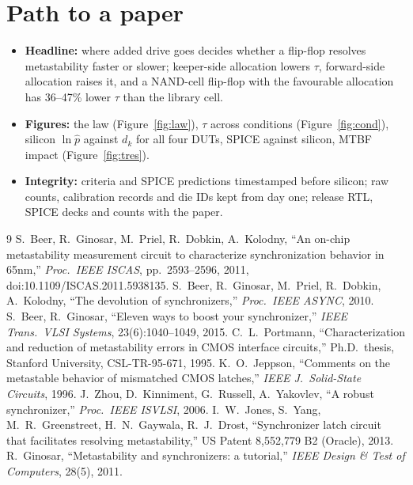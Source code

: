 \documentclass[11pt]{article}
\begin{document}
\section{Path to a paper}
\begin{itemize}
\item \textbf{Headline:} where added drive goes decides whether a flip-flop resolves metastability faster or slower;
  keeper-side allocation lowers $\tau$, forward-side allocation raises it, and a NAND-cell flip-flop with the
  favourable allocation has 36--47\% lower $\tau$ than the library cell.
\item \textbf{Figures:} the law (Figure~\ref{fig:law}), $\tau$ across conditions (Figure~\ref{fig:cond}), silicon
  $\ln\hat p$ against $d_k$ for all four DUTs, SPICE against silicon, MTBF impact (Figure~\ref{fig:tres}).
\item \textbf{Integrity:} criteria and SPICE predictions timestamped before silicon; raw counts, calibration records
  and die IDs kept from day one; release RTL, SPICE decks and counts with the paper.
\end{itemize}

\begin{thebibliography}{9}\small
{} S.~Beer, R.~Ginosar, M.~Priel, R.~Dobkin, A.~Kolodny, ``An on-chip metastability measurement
circuit to characterize synchronization behavior in 65nm,'' \emph{Proc.\ IEEE ISCAS}, pp.~2593--2596, 2011,
doi:10.1109/ISCAS.2011.5938135.
 S.~Beer, R.~Ginosar, M.~Priel, R.~Dobkin, A.~Kolodny, ``The devolution of synchronizers,''
\emph{Proc.\ IEEE ASYNC}, 2010.
 S.~Beer, R.~Ginosar, ``Eleven ways to boost your synchronizer,'' \emph{IEEE Trans.\ VLSI Systems},
23(6):1040--1049, 2015.
 C.~L.~Portmann, ``Characterization and reduction of metastability errors in CMOS interface
circuits,'' Ph.D.\ thesis, Stanford University, CSL-TR-95-671, 1995.
 K.~O.~Jeppson, ``Comments on the metastable behavior of mismatched CMOS latches,''
\emph{IEEE J.\ Solid-State Circuits}, 1996.
 J.~Zhou, D.~Kinniment, G.~Russell, A.~Yakovlev, ``A robust synchronizer,'' \emph{Proc.\ IEEE ISVLSI}, 2006.
 I.~W.~Jones, S.~Yang, M.~R.~Greenstreet, H.~N.~Gaywala, R.~J.~Drost, ``Synchronizer latch circuit
that facilitates resolving metastability,'' US Patent 8{,}552{,}779 B2 (Oracle), 2013.
 R.~Ginosar, ``Metastability and synchronizers: a tutorial,'' \emph{IEEE Design \& Test of
Computers}, 28(5), 2011.
\end{thebibliography}
\end{document}
